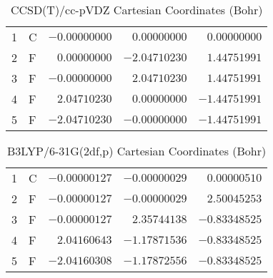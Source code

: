 \documentclass[10pt,oneside]{article}
\begin{document}
\begin{table}[h!]
\centering
\caption{CCSD(T)/cc-pVDZ Cartesian Coordinates (Bohr)}
\begin{tabular}{llrrr}
1  & C  & $-0.00000000$ & $ 0.00000000$ & $ 0.00000000$ \\
2  & F  & $ 0.00000000$ & $-2.04710230$ & $ 1.44751991$ \\
3  & F  & $-0.00000000$ & $ 2.04710230$ & $ 1.44751991$ \\
4  & F  & $ 2.04710230$ & $ 0.00000000$ & $-1.44751991$ \\
5  & F  & $-2.04710230$ & $-0.00000000$ & $-1.44751991$ \\
\end{tabular}
\end{table}

\begin{table}[h!]
\centering
\caption{B3LYP/6-31G(2df,p) Cartesian Coordinates (Bohr)}
\begin{tabular}{llrrr}
1  & C  & $-0.00000127$ & $-0.00000029$ & $ 0.00000510$ \\
2  & F  & $-0.00000127$ & $-0.00000029$ & $ 2.50045253$ \\
3  & F  & $-0.00000127$ & $ 2.35744138$ & $-0.83348525$ \\
4  & F  & $ 2.04160643$ & $-1.17871536$ & $-0.83348525$ \\
5  & F  & $-2.04160308$ & $-1.17872556$ & $-0.83348525$ \\
\end{tabular}
\end{table}

\clearpage
\end{document}
